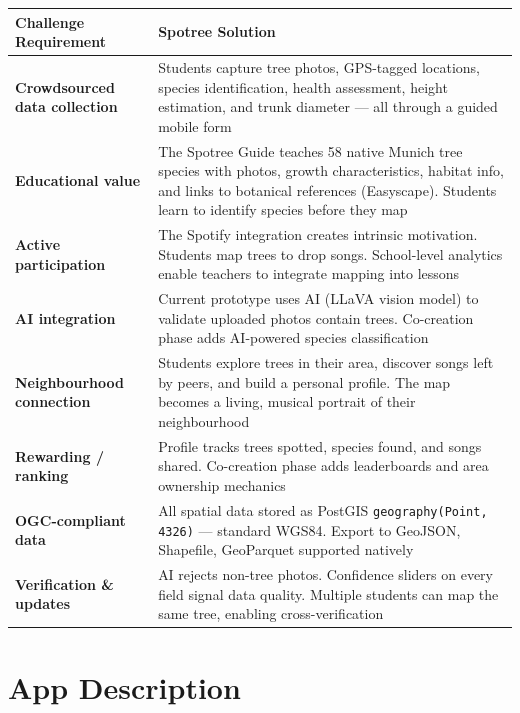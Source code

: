 \documentclass[11pt,a4paper]{article}
\begin{document}
\begin{center}
\small
\begin{tabularx}{\textwidth}{>{\bfseries}l X}
\toprule
\textbf{Challenge Requirement} & \textbf{Spotree Solution} \\
\midrule
Crowdsourced data collection & Students capture tree photos, GPS-tagged locations, species identification, health assessment, height estimation, and trunk diameter --- all through a guided mobile form \\
\addlinespace
Educational value & The Spotree Guide teaches 58 native Munich tree species with photos, growth characteristics, habitat info, and links to botanical references (Easyscape). Students learn to identify species before they map \\
\addlinespace
Active participation & The Spotify integration creates intrinsic motivation. Students map trees to drop songs. School-level analytics enable teachers to integrate mapping into lessons \\
\addlinespace
AI integration & Current prototype uses AI (LLaVA vision model) to validate uploaded photos contain trees. Co-creation phase adds AI-powered species classification \\
\addlinespace
Neighbourhood connection & Students explore trees in their area, discover songs left by peers, and build a personal profile. The map becomes a living, musical portrait of their neighbourhood \\
\addlinespace
Rewarding / ranking & Profile tracks trees spotted, species found, and songs shared. Co-creation phase adds leaderboards and area ownership mechanics \\
\addlinespace
OGC-compliant data & All spatial data stored as PostGIS \texttt{geography(Point, 4326)} --- standard WGS84. Export to GeoJSON, Shapefile, GeoParquet supported natively \\
\addlinespace
Verification \& updates & AI rejects non-tree photos. Confidence sliders on every field signal data quality. Multiple students can map the same tree, enabling cross-verification \\
\bottomrule
\end{tabularx}
\end{center}

\section{App Description}
\end{document}
